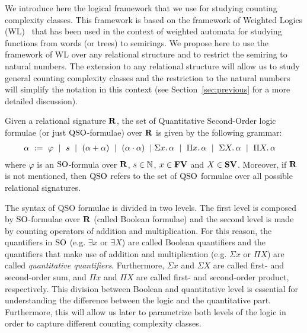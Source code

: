 
We introduce here the logical framework that we use for studying counting complexity classes. 
This framework is based on the framework of Weighted Logics (WL)~\cite{DrosteG07}  that has been used in the context of weighted automata for studying functions from words (or trees) to semirings. 
We propose here to use the framework of WL over any relational structure and to restrict the semiring to natural numbers. 
The extension to any relational structure will allow us to study general counting complexity classes and the restriction to the natural numbers will simplify the notation in this context (see Section~\ref{sec:previous} for a more detailed discussion).

Given a relational signature $\mathbf{R}$, the set of Quantitative Second-Order logic formulae (or just ${\rm QSO}$-formulae) over $\mathbf{R}$ is given by the following grammar:
\begin{align}
\alpha \ &:= \ \varphi \ \mid \ s \ \mid \ (\alpha \add \alpha) \ \mid\ (\alpha \mult \alpha) \ \mid \sa{x} \alpha \ \mid \ \pa{x} \alpha \ \mid \ \sa{X} \alpha \ \mid \ \pa{X} \alpha \label{syntax} 
\end{align}
where $\varphi$ is an ${\rm SO}$-formula over $\mathbf{R}$, $s \in \mathbb{N}$, $x \in \mathbf{FV}$ and $X \in \mathbf{SV}$. Moreover, if $\mathbf{R}$ is not mentioned, then ${\rm QSO}$ refers to the set of ${\rm QSO}$ formulae over all possible relational signatures.
 
The syntax of QSO formulae is divided in two levels. 
The first level is composed by ${\rm SO}$-formulae over $\mathbf{R}$ (called Boolean formulae) and the second level is made by counting operators of addition and multiplication. 
For this reason, the quantifiers in ${\rm SO}$ (e.g. $\exists x$ or $\exists X$) are called Boolean quantifiers and the quantifiers that make use of addition and multiplication (e.g. $\Sigma x$ or $\Pi X$) are called {\em quantitative quantifiers}.
Furthermore, $\Sigma x$ and $\Sigma X$ are called first- and second-order sum, and $\Pi x$ and $\Pi X$ are called first- and second-order product, respectively.
This division between Boolean and quantitative level is essential for understanding the difference between the logic and the quantitative part. 
Furthermore, this will allow us later to parametrize both levels of the logic in order to capture different counting complexity classes.

